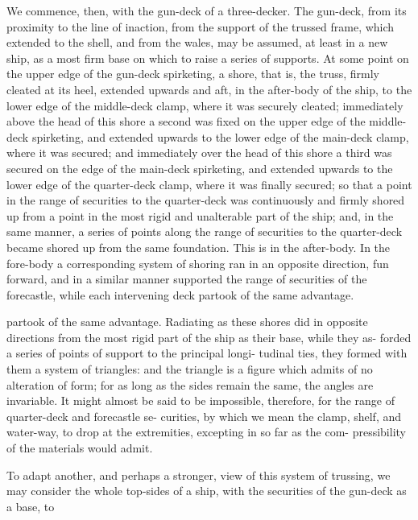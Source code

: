 \documentclass{article}
\begin{document}
We commence, then, with the gun-deck of a three-decker. The gun-deck, from its proximity to the line of inaction, from the support of the trussed frame, which extended to the shell, and from the wales, may be assumed, at least in a new ship, as a most firm base on which to raise a series of supports. At some point on the upper edge of the gun-deck spirketing, a shore, that is, the truss, firmly cleated at its heel, extended upwards and aft, in the after-body of the ship, to the lower edge of the middle-deck clamp, where it was securely cleated; immediately above the head of this shore a second was fixed on the upper edge of the middle-deck spirketing, and extended upwards to the lower edge of the main-deck clamp, where it was secured; and immediately over the head of this shore a third was secured on the edge of the main-deck spirketing, and extended upwards to the lower edge of the quarter-deck clamp, where it was finally secured; so that a point in the range of securities to the quarter-deck was continuously and firmly shored up from a point in the most rigid and unalterable part of the ship; and, in the same manner, a series of points along the range of securities to the quarter-deck became shored up from the same foundation. This is in the after-body. In the fore-body a corresponding system of shoring ran in an opposite direction, fun forward, and in a similar manner supported the range of securities of the forecastle, while each intervening deck partook of the same advantage.

partook of the same advantage.
Radiating as these shores did in opposite directions from
the most rigid part of the ship as their base, while they as-
forded a series of points of support to the principal longi-
tudinal ties, they formed with them a system of triangles:
and the triangle is a figure which admits of no alteration
of form; for as long as the sides remain the same, the angles
are invariable. It might almost be said to be impossible,
therefore, for the range of quarter-deck and forecastle se-
curities, by which we mean the clamp, shelf, and water-way,
to drop at the extremities, excepting in so far as the com-
pressibility of the materials would admit.

To adapt another, and perhaps a stronger, view of this system of trussing, we may consider the whole top-sides of a ship, with the securities of the gun-deck as a base, to
\end{document}
